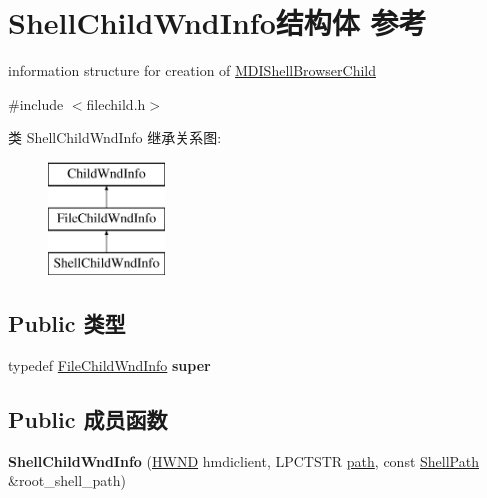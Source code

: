 \hypertarget{struct_shell_child_wnd_info}{}\section{Shell\+Child\+Wnd\+Info结构体 参考}
\label{struct_shell_child_wnd_info}


information structure for creation of \hyperlink{struct_m_d_i_shell_browser_child}{M\+D\+I\+Shell\+Browser\+Child}  




{\ttfamily \#include $<$filechild.\+h$>$}

类 Shell\+Child\+Wnd\+Info 继承关系图\+:\begin{figure}[H]
\begin{center}
\leavevmode
\includegraphics[height=3.000000cm]{struct_shell_child_wnd_info}
\end{center}
\end{figure}
\subsection*{Public 类型}
\begin{DoxyCompactItemize}
\item 
\mbox{\label{struct_shell_child_wnd_info_abaaf02d324fb608516bc39c8b593d802}} 
typedef \hyperlink{struct_file_child_wnd_info}{File\+Child\+Wnd\+Info} {\bfseries super}
\end{DoxyCompactItemize}
\subsection*{Public 成员函数}
\begin{DoxyCompactItemize}
\item 
\mbox{\label{struct_shell_child_wnd_info_af76be08f72cfd4fb595bcf6769e423f8}} 
{\bfseries Shell\+Child\+Wnd\+Info} (\hyperlink{interfacevoid}{H\+W\+ND} hmdiclient, L\+P\+C\+T\+S\+TR \hyperlink{structpath}{path}, const \hyperlink{struct_shell_path}{Shell\+Path} \&root\+\_\+shell\+\_\+path)
\end{DoxyCompactItemize}
